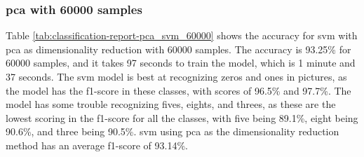 \subsubsection{\gls{pca} with 60000 samples}\label{subsubsec:experiment-1-results-pca-60000}
Table \ref{tab:classification-report-pca_svm_60000} shows the accuracy for \gls{svm} with \gls{pca} as dimensionality reduction with 60000 samples. The accuracy is 93.25\% for 60000 samples, and it takes 97 seconds to train the model, which is 1 minute and 37 seconds. The \gls{svm} model is best at recognizing zeros and ones in pictures, as the model has the f1-score in these classes, with scores of 96.5\% and 97.7\%. The model has some trouble recognizing fives, eights, and threes, as these are the lowest scoring in the f1-score for all the classes, with five being 89.1\%, eight being 90.6\%, and three being 90.5\%. \gls{svm} using \gls{pca} as the dimensionality reduction method has an average f1-score of 93.14\%.

